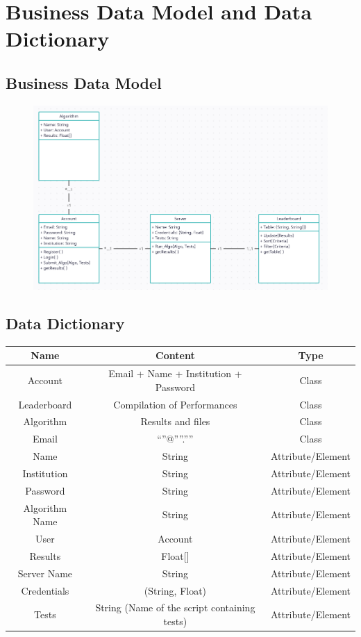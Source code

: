 \documentclass[12pt]{article}
\begin{document}
\section{Business Data Model and Data Dictionary}
\subsection{Business Data Model}
\begin{figure}[H]
    \centering
    \includegraphics[width=1\linewidth]{diagrams/Class.png}
\end{figure}
\subsection{Data Dictionary}
\begin{table}[H]
    \centering
    \begin{tabular}{|c|c|c|}
         \hline \textbf{Name} & \textbf{Content} & \textbf{Type} \\
         \hline Account & Email + Name + Institution + Password & Class \\
         \hline Leaderboard & Compilation of Performances & Class \\
         \hline Algorithm & Results and files & Class \\
         \hline Email & “”@””.”” & Class \\
         \hline Name & String & Attribute/Element \\
         \hline Institution & String & Attribute/Element \\
         \hline Password & String & Attribute/Element \\
         \hline Algorithm Name & String & Attribute/Element \\
         \hline User & Account & Attribute/Element \\
         \hline Results & Float[] & Attribute/Element \\
         \hline Server Name & String & Attribute/Element \\
         \hline Credentials & (String, Float) & Attribute/Element \\
         \hline Tests & String (Name of the script containing tests) & Attribute/Element \\
         \hline
    \end{tabular}
\end{table}
\end{document}
